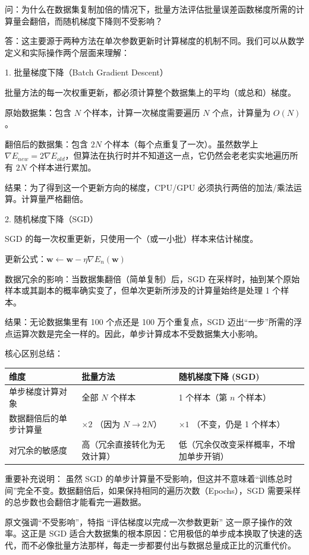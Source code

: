 \documentclass{article}
\begin{document}
{\color{blue}
问：为什么在数据集复制加倍的情况下，批量方法评估批量误差函数梯度所需的计算量会翻倍，而随机梯度下降则不受影响？

答：这主要源于两种方法在单次参数更新时计算梯度的机制不同。我们可以从数学定义和实际操作两个层面来理解：

1. 批量梯度下降（Batch Gradient Descent）

批量方法的每一次权重更新，都必须计算整个数据集上的平均（或总和）梯度。

原始数据集：包含 $N$ 个样本，计算一次梯度需要遍历 $N$ 个点，计算量为 $O(N)$。

翻倍后的数据集：包含 $2N$ 个样本（每个点重复了一次）。虽然数学上 $\nabla E_{new} = 2 \nabla E_{old}$，但算法在执行时并不知道这一点，它仍然会老老实实地遍历所有 $2N$ 个样本进行累加。

结果：为了得到这一个更新方向的梯度，CPU/GPU 必须执行两倍的加法/乘法运算。计算量严格翻倍。

2. 随机梯度下降（SGD）

SGD 的每一次权重更新，只使用一个（或一小批）样本来估计梯度。

更新公式：$\mathbf{w} \leftarrow \mathbf{w} - \eta \nabla E_n(\mathbf{w})$

数据冗余的影响：当数据集翻倍（简单复制）后，SGD 在采样时，抽到某个原始样本或其副本的概率确实变了，但单次更新所涉及的计算量始终是处理 1 个样本。

结果：无论数据集里有 100 个点还是 100 万个重复点，SGD 迈出“一步”所需的浮点运算次数是完全一样的。因此，单步计算成本不受数据集大小影响。
}

{\color{blue}
核心区别总结：

\begin{table}[htbp]
\centering
\renewcommand{\arraystretch}{1.8}   %
\color{blue}
\begin{tabular}{|p{4.5cm}|p{4.5cm}|p{6cm}|}\hline 
维度 & 批量方法 & 随机梯度下降 (SGD) \\ \hline 
单步梯度计算对象 & 全部 $N$ 个样本 & 1 个样本（第 $n$ 个样本） \\ \hline
数据翻倍后的单步计算量 & $\times 2$ （因为 $N \to 2N$） & $\times 1$ （不变，仍是 1 个样本） \\ \hline 
对冗余的敏感度 & 高（冗余直接转化为无效计算） & 低（冗余仅改变采样概率，不增加单步开销） \\ \hline 
\end{tabular}
\end{table}

重要补充说明：
虽然 SGD 的单步计算量不受影响，但这并不意味着“训练总时间”完全不变。数据翻倍后，如果保持相同的遍历次数（Epochs），SGD 需要采样的总步数也会翻倍才能看完一遍数据。

原文强调“不受影响”，特指 “评估梯度以完成一次参数更新” 这一原子操作的效率。这正是 SGD 适合大数据集的根本原因：它用极低的单步成本换取了快速的迭代，而不必像批量方法那样，每走一步都要付出与数据总量成正比的沉重代价。
}
\end{document}
